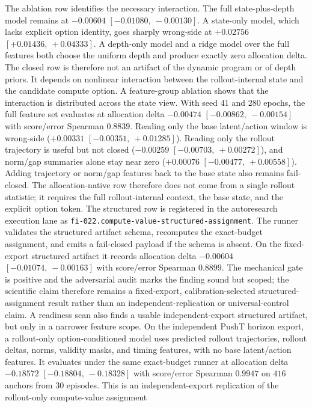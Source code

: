 The ablation row identifies the necessary interaction.  The full
state-plus-depth model remains at $-0.00604$ $[-0.01080,\ -0.00130]$.  A
state-only model, which lacks explicit option identity, goes sharply wrong-side
at $+0.02756$ $[+0.01436,\ +0.04333]$.  A depth-only model and a ridge model
over the full features both choose the uniform depth and produce exactly zero
allocation delta.  The closed row is therefore not an artifact of the dynamic
program or of depth priors.  It depends on nonlinear interaction between the
rollout-internal state and the candidate compute option.
A feature-group ablation shows that the interaction is distributed across the
state view.  With seed $41$ and $280$ epochs, the full feature set evaluates at
allocation delta $-0.00474$ $[-0.00862,\ -0.00154]$ with score/error Spearman
$0.8839$.  Reading only the base latent/action window is wrong-side
($+0.00331$ $[-0.00351,\ +0.01285]$).  Reading only the rollout trajectory is
useful but not closed ($-0.00259$ $[-0.00703,\ +0.00272]$), and norm/gap
summaries alone stay near zero ($+0.00076$ $[-0.00477,\ +0.00558]$).  Adding
trajectory or norm/gap features back to the base state also remains
fail-closed.  The allocation-native row therefore does not come from a single
rollout statistic; it requires the full rollout-internal context, the base
state, and the explicit option token.
The structured row is registered in the autoresearch execution lane as
\texttt{fi-022.compute-value-structured-assignment}.  The runner validates the
structured artifact schema, recomputes the exact-budget assignment, and emits
a fail-closed payload if the schema is absent.  On the fixed-export structured
artifact it records allocation delta $-0.00604$ $[-0.01074,\ -0.00163]$ with
score/error Spearman $0.8899$.  The mechanical gate is positive and the
adversarial audit marks the finding sound but scoped; the scientific claim
therefore remains a fixed-export, calibration-selected structured-assignment
result rather than an independent-replication or universal-control claim.
A readiness scan also finds a usable independent-export structured
artifact, but only in a narrower feature scope.  On the independent PushT
horizon export, a rollout-only option-conditioned model uses predicted rollout
trajectories, rollout deltas, norms, validity masks, and timing features, with
no base latent/action features.  It evaluates under the same exact-budget
runner at allocation delta $-0.18572$ $[-0.18804,\ -0.18328]$ with score/error
Spearman $0.9947$ on $416$ anchors from $30$ episodes.  This is an
independent-export replication of the rollout-only compute-value assignment

